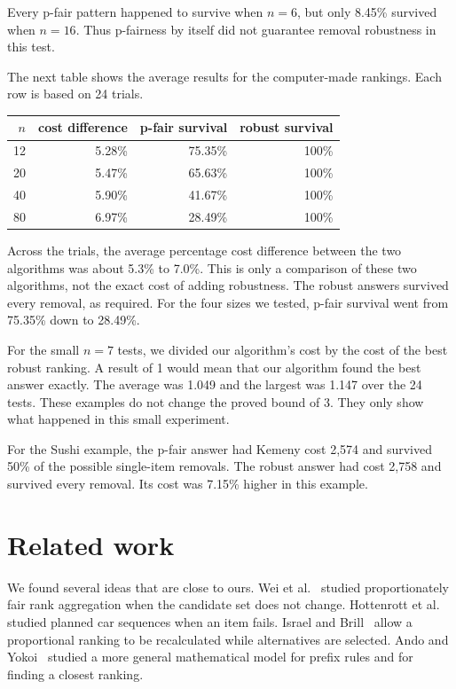 \documentclass[11pt]{article}
\begin{document}
Every p-fair pattern happened to survive when $n=6$, but only 8.45\% survived
when $n=16$.  Thus p-fairness by itself did not guarantee removal robustness
in this test.

The next table shows the average results for the computer-made rankings.  Each
row is based on 24 trials.

\begin{center}
\begin{tabular}{@{}rrrr@{}}
\toprule
$n$ & cost difference & p-fair survival & robust survival \\
\midrule
12 & 5.28\% & 75.35\% & 100\% \\
20 & 5.47\% & 65.63\% & 100\% \\
40 & 5.90\% & 41.67\% & 100\% \\
80 & 6.97\% & 28.49\% & 100\% \\
\bottomrule
\end{tabular}
\end{center}

Across the trials, the average percentage cost difference between the two
algorithms was about 5.3\% to 7.0\%.  This is only a comparison of these two
algorithms, not the exact cost of adding robustness.  The robust answers
survived every removal, as required.  For the four sizes we tested, p-fair
survival went from 75.35\% down to 28.49\%.

For the small $n=7$ tests, we divided our algorithm's cost by the cost of the
best robust ranking.  A result of 1 would mean that our algorithm found the
best answer exactly.  The average was 1.049 and the largest was 1.147 over the
24 tests.  These examples do not change the proved bound of 3.  They only show
what happened in this small experiment.

For the Sushi example, the p-fair answer had Kemeny cost 2,574 and survived
50\% of the possible single-item removals.  The robust answer had cost 2,758
and survived every removal.  Its cost was 7.15\% higher in this example.

\section{Related work}

We found several ideas that are close to ours.  Wei et al.~\cite{wei2022}
studied proportionately fair rank aggregation when the candidate set does not
change.  Hottenrott et al.~\cite{hottenrott2021} studied planned car sequences
when an item fails.  Israel and Brill~\cite{israel2025} allow a proportional
ranking to be recalculated while alternatives are selected.  Ando and
Yokoi~\cite{ando2026} studied a more general mathematical model for prefix
rules and for finding a closest ranking.
\end{document}

